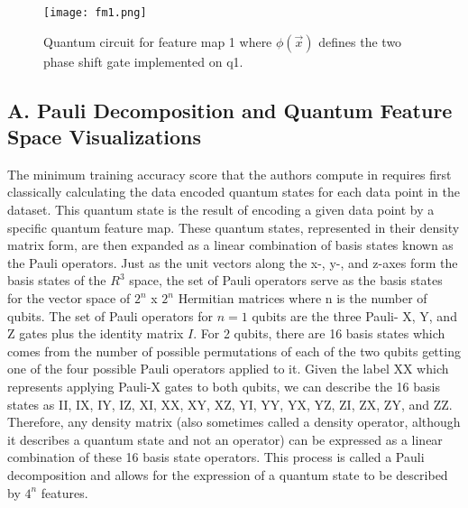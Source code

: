 \documentclass[
	a4paper, %
	10pt, %
	unnumberedsections, %
	twoside, %
]{LTJournalArticle}
\begin{document}
\begin{figure}
	\texttt{[image: fm1.png]}
	\caption{Quantum circuit for feature map 1 where $\phi(\vec{x})$ defines the two phase shift gate implemented on q1.}
	\label{fig:fm1}
\end{figure}

\subsection{A. Pauli Decomposition and Quantum Feature Space Visualizations}
The minimum training accuracy score that the authors compute in \autocite{suzuki2020analysis} requires first classically calculating the data encoded quantum states for each data point in the 
dataset. This quantum state is the result of encoding a given data point by a specific quantum feature map. These quantum states, represented in their density matrix form, are then expanded as 
a linear combination of basis states known as the Pauli operators. Just as the unit vectors along the x-, y-, and z-axes form the basis states of the $R^3$ space, the set of Pauli operators 
serve as the basis states for the vector space of $2^n$ x $2^n$ Hermitian matrices where n is the number of qubits. The set of Pauli operators for $n=1$ qubits are the three Pauli- X, Y, and 
Z gates plus the identity matrix $I$. For 2 qubits, there are 16 basis states which comes from the number of possible permutations of each of the two qubits getting one of the four possible 
Pauli operators applied to it. Given the label XX which represents applying Pauli-X gates to both qubits, we can describe the 16 basis states as II, IX, IY, IZ, XI, XX, XY, XZ, YI, YY, YX, YZ, 
ZI, ZX, ZY, and ZZ. Therefore, any density matrix (also sometimes called a density operator, although it describes a quantum state and not an operator) can be expressed as a linear combination 
of these 16 basis state operators. This process is called a Pauli decomposition and allows for the expression of a quantum state to be described by $4^n$ features.
\end{document}
